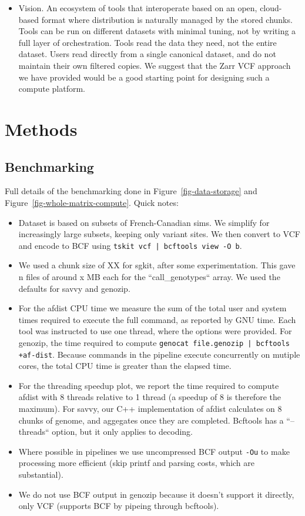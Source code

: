 \documentclass[a4paper,num-refs]{oup-contemporary}
\begin{document}
\begin{itemize}
\item Vision. An ecosystem of tools that interoperate
based on an open, cloud-based format where distribution is naturally
managed by the stored chunks. Tools can be run on different datasets
with minimal tuning, not by writing a full layer of orchestration.
Tools read the data they need, not the entire dataset. Users read
directly from a single canonical dataset, and do not maintain
their own filtered copies. We suggest that the Zarr VCF approach
we have provided would be a good starting point for designing
such a compute platform.

\end{itemize}

\section{Methods}

\subsection{Benchmarking}
Full details of the benchmarking done in
Figure~\ref{fig-data-storage} and
Figure~\ref{fig-whole-matrix-compute}.
Quick notes:

\begin{itemize}
\item Dataset is based on subsets of French-Canadian sims. We simplify
for increasingly large subsets, keeping only variant sites. We then
convert to VCF and encode to BCF using
\texttt{tskit vcf | bcftools view -O b}.
\item We used a chunk size of XX for sgkit, after some experimentation.
This gave n files of around x MB each for the ``call\_genotypes`` array.
We used the defaults for savvy and genozip.
\item For the afdist CPU time we measure the sum of the total user and
system times required to execute the full command, as reported by GNU
time. Each tool was instructed to use one thread, where the options
were provided. For genozip, the time required to compute
\texttt{genocat file.genozip | bcftools +af-dist}. Because commands
in the pipeline execute concurrently on mutiple cores, the total CPU time is
greater than the elapsed time.
\item For the threading speedup plot, we report the time required to compute
afdist with 8 threads relative to 1 thread (a speedup of 8 is therefore
the maximum). For savvy, our C++ implementation of afdist calculates
on 8 chunks of genome, and aggegates once they are completed.
Bcftools has a ``--threads`` option, but it only applies to decoding.
\item Where possible in pipelines we use uncompressed BCF
 output \texttt{-Ou} to make processing more efficient (skip printf
and parsing costs, which are substantial).
\item We do not use BCF output in genozip because it doesn't support
it directly, only VCF (supports BCF by pipeing through bcftools).
\end{itemize}
\end{document}

